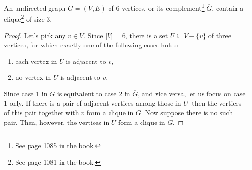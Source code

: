 \begin{theorem}
    An undirected graph $G=(V,E)$ of 6 vertices, or its complement\footnote{See page 1085 in the book.} $\overline{G}$, contain a clique\footnote{See page 1081 in the book.} of size 3.
\end{theorem}

\begin{proof}
    Let's pick any $v\in V$.
    Since $|V|=6$, there is a set $U\subseteq V-\{v\}$ of three vertices, for which exactly one of the following cases holds:
    \begin{enumerate}
        \item each vertex in $U$ is adjacent to $v$,
        \item no vertex in $U$ is adjacent to $v$.
    \end{enumerate}
    Since case 1 in $G$ is equivalent to case 2 in $\overline{G}$, and vice versa, let us focus on case 1 only.
    If there is a pair of adjacent vertices among those in $U$, then the vertices of this pair together with $v$ form a clique in $G$.
    Now suppose there is no such pair.
    Then, however, the vertices in $U$ form a clique in $\overline{G}$.
\end{proof}
